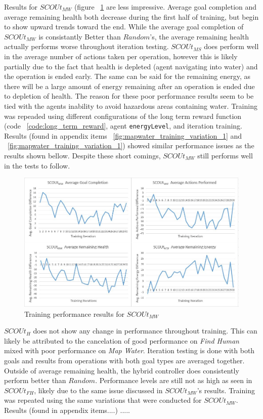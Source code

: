 Results for $SCOUt_{MW}$ (figure ~\ref{fig:mapwater_training_results} are less impressive.
Average goal completion and average remaining health both decrease during the first half of training, but begin to show upward trends toward the end.
While the average goal completion of $SCOUt_{MW}$ is consistantly Better than $Random$'s, the average remaining health actually performs worse throughout iteration testing.
$SCOUt_{MS}$ does perform well in the average number of actions taken per operation, however this is likely partially due to the fact that health is depleted (agent navigating into water) and the operation is ended early.
The same can be said for the remaining energy, as there will be a large amount of energy remaining after an operation is ended due to depletion of health.
The reason for these poor performance results seem to be tied with the agents inability to avoid hazardous areas containing water.
Training was repeaded using different configurations of the long term reward function (code ~\ref{code:long_term_reward}, agent \texttt{energyLevel}, and iteration training.
Results (found in appendix items ~\ref{fig:mapwater_training_variation_1} and ~\ref{fig:mapwater_training_variation_1}) showed similar performance issues as the results shown bellow.
Despite these short comings, $SCOUt_{MW}$ still performs well in the tests to follow.

\begin{figure}[h]
  \includegraphics[width=1.0\columnwidth]{Figures/Results/Training/SCOUt-MapWater.JPG}
  \caption{Training performance results for $SCOUt_{MW}$}
  \label{fig:mapwater_training_results}
\end{figure}

$SCOUt_{H}$ does not show any change in performance throughout training.
This can likely be attributed to the cancelation of good performance on \textit{Find Human} mixed with poor performance on \textit{Map Water}.
Iteration testing is done with both goals and results from operations with both goal types are averaged together.
Outside of average remaining health, the hybrid controller does consistently perform better than $Random$.
Performance levels are still not as high as seen in $SCOUt_{FH}$, likely due to the same issue discussed in $SCOUt_{MW}$'s results. Training was repeated using the same variations that were conducted for $SCOUt_{MW}$.
Results (found in appendix items....) .....

